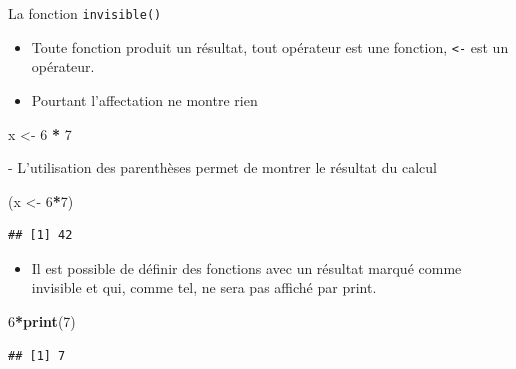 \documentclass[
  ignorenonframetext,
]{beamer}
\newenvironment{Shaded}{\begin{snugshade}}{\end{snugshade}}
\newcommand{\DecValTok}[1]{\textcolor[rgb]{0.00,0.00,0.81}{#1}}
\newcommand{\FunctionTok}[1]{\textcolor[rgb]{0.13,0.29,0.53}{\textbf{#1}}}
\newcommand{\NormalTok}[1]{#1}
\newcommand{\OtherTok}[1]{\textcolor[rgb]{0.56,0.35,0.01}{#1}}
\newcommand{\SpecialCharTok}[1]{\textcolor[rgb]{0.81,0.36,0.00}{\textbf{#1}}}
\providecommand{\tightlist}{%
  \setlength{\itemsep}{0pt}\setlength{\parskip}{0pt}}
\begin{document}
\begin{frame}[fragile]{La fonction \texttt{invisible()}}
\protect\hypertarget{la-fonction-invisible}{}
\begin{itemize}
\tightlist
\item
  Toute fonction produit un résultat, tout opérateur est une fonction,
  \texttt{\textless{}-} est un opérateur.
\item
  Pourtant l'affectation ne montre rien
\end{itemize}

\tiny

\begin{Shaded}
\begin{Highlighting}[]
\NormalTok{x }\OtherTok{\textless{}{-}} \DecValTok{6} \SpecialCharTok{*} \DecValTok{7}
\end{Highlighting}
\end{Shaded}

\normalsize - L'utilisation des parenthèses permet de montrer le
résultat du calcul

\tiny

\begin{Shaded}
\begin{Highlighting}[]
\NormalTok{(x }\OtherTok{\textless{}{-}} \DecValTok{6}\SpecialCharTok{*}\DecValTok{7}\NormalTok{)}
\end{Highlighting}
\end{Shaded}

\begin{verbatim}
## [1] 42
\end{verbatim}

\normalsize

\begin{itemize}
\tightlist
\item
  Il est possible de définir des fonctions avec un résultat marqué comme
  invisible et qui, comme tel, ne sera pas affiché par print.
\end{itemize}

\tiny

\begin{Shaded}
\begin{Highlighting}[]
\DecValTok{6}\SpecialCharTok{*}\FunctionTok{print}\NormalTok{(}\DecValTok{7}\NormalTok{)}
\end{Highlighting}
\end{Shaded}

\begin{verbatim}
## [1] 7
\end{verbatim}


\end{frame}
\end{document}
